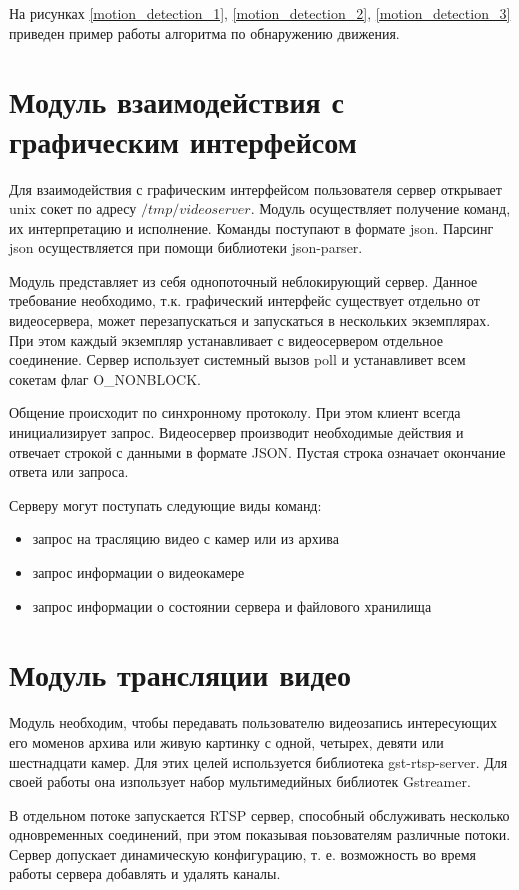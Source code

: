 На рисунках \ref{motion_detection_1}, \ref{motion_detection_2}, \ref{motion_detection_3}
приведен пример работы алгоритма по обнаружению движения.

\section{Модуль взаимодействия с графическим интерфейсом}
Для взаимодействия с графическим интерфейсом пользователя сервер открывает unix сокет
по адресу $/tmp/videoserver$. Модуль осуществляет получение команд, их интерпретацию и исполнение.
Команды поступают в формате json. Парсинг json осуществляется при помощи библиотеки json-parser.

Модуль представляет из себя однопоточный неблокирующий сервер. Данное требование необходимо, т.к.
графический интерфейс существует отдельно от видеосервера, может перезапускаться и запускаться в
нескольких экземплярах. При этом каждый экземпляр устанавливает с видеосервером отдельное соединение.
Сервер использует системный вызов poll и устанавливет всем сокетам флаг O\_NONBLOCK.

Общение происходит по синхронному протоколу. При этом клиент всегда инициализирует запрос.
Видеосервер производит необходимые действия и отвечает строкой с данными в формате JSON.
Пустая строка означает окончание ответа или запроса.

Серверу могут поступать следующие виды команд:
\smallskip
\begin{itemize}
	\item запрос на трасляцию видео с камер или из архива
	\item запрос информации о видеокамере
	\item запрос информации о состоянии сервера и файлового хранилища
\end{itemize}

\section{Модуль трансляции видео}
Модуль необходим, чтобы передавать пользователю видеозапись интересующих его моменов архива или
живую картинку с одной, четырех, девяти или шестнадцати камер.
Для этих целей используется библиотека gst-rtsp-server. Для своей работы она изпользует набор
мультимедийных библиотек Gstreamer.

В отдельном потоке запускается RTSP сервер, способный обслуживать несколько одновременных соединений,
при этом показывая поьзователям различные потоки.
Сервер допускает динамическую конфигурацию, т. е. возможность во время работы сервера добавлять
и удалять каналы.


